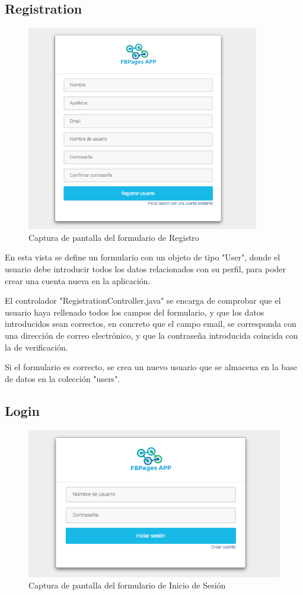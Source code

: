 \subsection{Registration}
\begin{figure}[H]
\centering
\includegraphics[width=4in]{figuras/registro.png}
\caption{Captura de pantalla del formulario de Registro} \label{fig:registration}
\end{figure}
En esta vista se define un formulario con un objeto de tipo "User", donde el usuario debe introducir todos los datos relacionados con su perfil, para poder crear una cuenta nueva en la aplicación. 

El controlador "RegistrationController.java" se encarga de comprobar que el usuario haya rellenado todos los campos del formulario, y que los datos introducidos sean correctos, en concreto que el campo email, se corresponda con una dirección de correo electrónico, y que la contraseña introducida coincida con la de verificación. 

Si el formulario es correcto, se crea un nuevo usuario que se almacena en la base de datos en la colección "users". 

\subsection{Login}

\begin{figure}[H]
\centering
\includegraphics[width=5in]{figuras/login.png}
\caption{Captura de pantalla del formulario de Inicio de Sesión} \label{fig:login}
\end{figure}

